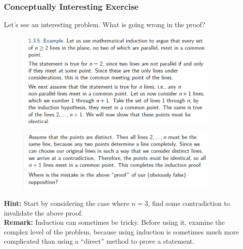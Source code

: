 \documentclass[10pt, t]{beamer}
\newcommand{\nullspace}{~\\[15pt]}
\begin{document}
\begin{frame}[allowframebreaks]
    \frametitle{Conceptually Interesting Exercise}

    Let's see an interesting problem. What is going wrong in the proof?
    \begin{figure}[H]
        \centering
        \includegraphics[width=0.9\textwidth]{2020-09-23-13-12-35.png}
    \end{figure}
    \begin{figure}[H]
        \centering
        \includegraphics[width=0.9\textwidth]{2020-09-23-13-13-41.png}
    \end{figure}
    \textbf{Hint:} Start by considering the case where $n=3$, find some contradiction to invalidate the above proof.\nullspace
    \textbf{Remark:} Induction can sometimes be tricky. Before using it, examine the complex level of the problem, because using induction is sometimes
    much more complicated than using a ``direct'' method to prove a statement.
\end{frame}
\end{document}
